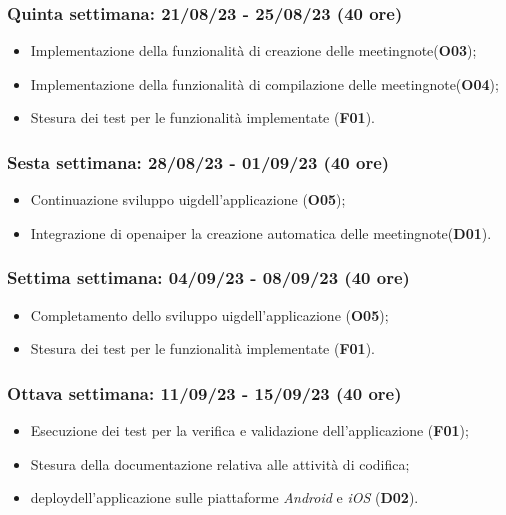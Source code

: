 \subsubsection{Quinta settimana: 21/08/23 - 25/08/23 (40 ore)}
    \begin{itemize}
        \item Implementazione della funzionalità di creazione delle \gls{meetingnote}\glsoccur (\textbf{O03});
        \item Implementazione della funzionalità di compilazione delle \gls{meetingnote}\glsoccur (\textbf{O04});
        \item Stesura dei test per le funzionalità implementate (\textbf{F01}).
    \end{itemize}
\subsubsection{Sesta settimana: 28/08/23 - 01/09/23 (40 ore)}
    \begin{itemize}
        \item Continuazione sviluppo \gls{uig}\glsoccur dell'applicazione (\textbf{O05});
        \item Integrazione di \gls{openai}\glsoccur per la creazione automatica delle \gls{meetingnote}\glsoccur (\textbf{D01}).
    \end{itemize}
\subsubsection{Settima settimana: 04/09/23 - 08/09/23 (40 ore)}
    \begin{itemize}
        \item Completamento dello sviluppo \gls{uig}\glsoccur dell'applicazione (\textbf{O05});
        \item Stesura dei test per le funzionalità implementate (\textbf{F01}).
    \end{itemize} 
\subsubsection{Ottava settimana: 11/09/23 - 15/09/23 (40 ore)}
    \begin{itemize}
        \item Esecuzione dei test per la verifica e validazione dell'applicazione (\textbf{F01});
        \item Stesura della documentazione relativa alle attività di codifica;
        \item \Gls{deploy}\glsoccur dell'applicazione sulle piattaforme \emph{Android} e \emph{iOS} (\textbf{D02}).
    \end{itemize}

